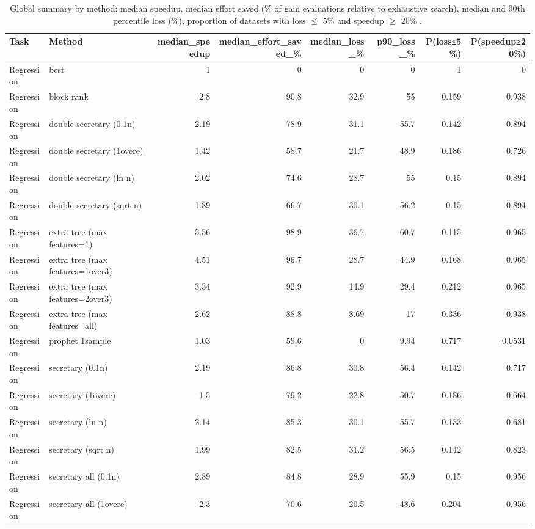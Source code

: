 \begin{table}[t]
\centering
\caption{Global summary by method: median speedup, median effort saved (\% of gain evaluations relative to exhaustive search), median and 90th percentile loss (\%), proportion of datasets with loss $\leq$ 5\% and speedup $\geq$ 20\% .}
\label{tab:global-summary}
\begin{tabular}{llrrrrrr}
\toprule
Task & Method & median\_speedup & median\_effort\_saved\_\% & median\_loss\_\% & p90\_loss\_\% & P(loss≤5\%) & P(speedup≥20\%) \\
\midrule
Regression & best & 1 & 0 & 0 & 0 & 1 & 0 \\
Regression & block rank & 2.8 & 90.8 & 32.9 & 55 & 0.159 & 0.938 \\
Regression & double secretary (0.1n) & 2.19 & 78.9 & 31.1 & 55.7 & 0.142 & 0.894 \\
Regression & double secretary (1overe) & 1.42 & 58.7 & 21.7 & 48.9 & 0.186 & 0.726 \\
Regression & double secretary (ln n) & 2.02 & 74.6 & 28.7 & 55 & 0.15 & 0.894 \\
Regression & double secretary (sqrt n) & 1.89 & 66.7 & 30.1 & 56.2 & 0.15 & 0.894 \\
Regression & extra tree (max features=1) & 5.56 & 98.9 & 36.7 & 60.7 & 0.115 & 0.965 \\
Regression & extra tree (max features=1over3) & 4.51 & 96.7 & 28.7 & 44.9 & 0.168 & 0.965 \\
Regression & extra tree (max features=2over3) & 3.34 & 92.9 & 14.9 & 29.4 & 0.212 & 0.965 \\
Regression & extra tree (max features=all) & 2.62 & 88.8 & 8.69 & 17 & 0.336 & 0.938 \\
Regression & prophet 1sample & 1.03 & 59.6 & 0 & 9.94 & 0.717 & 0.0531 \\
Regression & secretary (0.1n) & 2.19 & 86.8 & 30.8 & 56.4 & 0.142 & 0.717 \\
Regression & secretary (1overe) & 1.5 & 79.2 & 22.8 & 50.7 & 0.186 & 0.664 \\
Regression & secretary (ln n) & 2.14 & 85.3 & 30.1 & 55.7 & 0.133 & 0.681 \\
Regression & secretary (sqrt n) & 1.99 & 82.5 & 31.2 & 56.5 & 0.142 & 0.823 \\
Regression & secretary all (0.1n) & 2.89 & 84.8 & 28.9 & 55.9 & 0.15 & 0.956 \\
Regression & secretary all (1overe) & 2.3 & 70.6 & 20.5 & 48.6 & 0.204 & 0.956 \\

\end{tabular}
\end{table}
